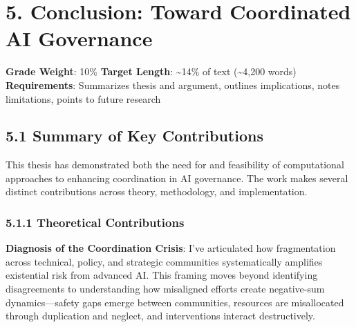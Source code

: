 \documentclass[
  11pt,
  letterpaper,
]{book}
\begin{document}
\chapter*{5. Conclusion: Toward Coordinated AI
Governance}\label{sec-conclusion}


\begin{tcolorbox}[enhanced jigsaw, toprule=.15mm, colbacktitle=quarto-callout-note-color!10!white, opacitybacktitle=0.6, leftrule=.75mm, coltitle=black, rightrule=.15mm, opacityback=0, bottomtitle=1mm, title=\textcolor{quarto-callout-note-color}{\faInfo}\hspace{0.5em}{Chapter Overview}, toptitle=1mm, breakable, titlerule=0mm, left=2mm, arc=.35mm, colframe=quarto-callout-note-color-frame, bottomrule=.15mm, colback=white]

\textbf{Grade Weight}: 10\% \textbar{} \textbf{Target Length}:
\textasciitilde14\% of text (\textasciitilde4,200 words)\\
\textbf{Requirements}: Summarizes thesis and argument, outlines
implications, notes limitations, points to future research

\end{tcolorbox}

\section*{5.1 Summary of Key Contributions}\label{sec-key-contributions}


This thesis has demonstrated both the need for and feasibility of
computational approaches to enhancing coordination in AI governance. The
work makes several distinct contributions across theory, methodology,
and implementation.

\subsection*{5.1.1 Theoretical
Contributions}\label{sec-theoretical-contributions}

\textbf{Diagnosis of the Coordination Crisis}: I've articulated how
fragmentation across technical, policy, and strategic communities
systematically amplifies existential risk from advanced AI. This framing
moves beyond identifying disagreements to understanding how misaligned
efforts create negative-sum dynamics---safety gaps emerge between
communities, resources are misallocated through duplication and neglect,
and interventions interact destructively.
\end{document}
